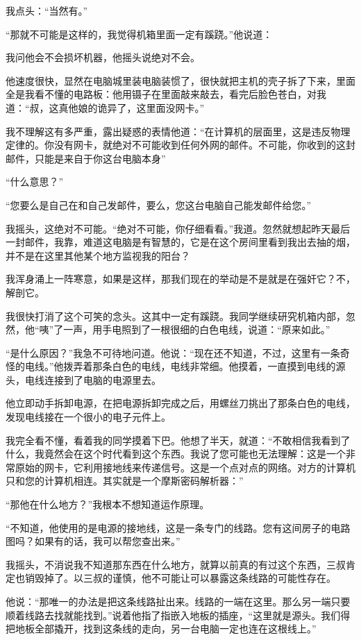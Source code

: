 我点头：“当然有。”

“那就不可能是这样的，我觉得机箱里面一定有蹊跷。”他说道：

我问他会不会损坏机器，他摇头说绝对不会。

他速度很快，显然在电脑城里装电脑装惯了，很快就把主机的壳子拆了下来，里面全是我看不懂的电路板：他用镊子在里面敲来敲去，看完后脸色苍白，对我道：“叔，这真他娘的诡异了，这里面没网卡。”

我不理解这有多严重，露出疑惑的表情他道：“在计算机的层面里，这是违反物理定律的。你没有网卡，就绝对不可能收到任何外网的邮件。不可能，你收到的这封邮件，只能是来自于你这台电脑本身”

“什么意思？”

“您要么是自己在和自己发邮件，要么，您这台电脑自己能发邮件给您。”

我摇头，这绝对不可能。“绝对不可能，你仔细看看。”我道。忽然就想起昨天最后一封邮件，我靠，难道这电脑是有智慧的，它是在这个房间里看到我出去抽的烟，并不是在这里其他某个地方监视我的阳台？

我浑身涌上一阵寒意，如果是这样，那我们现在的举动是不是就是在强奸它？不，解剖它。

我很快打消了这个可笑的念头。这其中一定有蹊跷。我同学继续研究机箱内部，忽然，他“咦”了一声，用手电照到了一根很细的白色电线，说道：“原来如此。”

“是什么原因？”我急不可待地问道。他说：“现在还不知道，不过，这里有一条奇怪的电线。”他拨弄着那条白色的电线，电线非常细。他摸着，一直摸到电线的源头，电线连接到了电脑的电源里去。

他立即动手拆卸电源，在把电源拆卸完成之后，用螺丝刀挑出了那条白色的电线，发现电线接在一个很小的电子元件上。

我完全看不懂，看着我的同学摸着下巴。他想了半天，就道：“不敢相信我看到了什么，我竟然会在这个时代看到这个东西。我说了您可能也无法理解：这是一个非常原始的网卡，它利用接地线来传递信号。这是一个点对点的网络。对方的计算机只和您的计算机相连。其实就是一个摩斯密码解析器：”

“那他在什么地方？”我根本不想知道运作原理。

“不知道，他使用的是电源的接地线，这是一条专门的线路。您有这间房子的电路图吗？如果有的话，我可以帮您查出来。”

我摇头，不消说我不知道那东西在什么地方，就算以前真的有过这个东西，三叔肯定也销毁掉了。以三叔的谨慎，他不可能让可以暴露这条线路的可能性存在。

他说：“那唯一的办法是把这条线路扯出来。线路的一端在这里。那么另一端只要顺着线路去找就能找到。”说着他指了指嵌入地板的插座，“这里就是源头。我们得把地板全部撬开，找到这条线的走向，另一台电脑一定也连在这根线上。”


